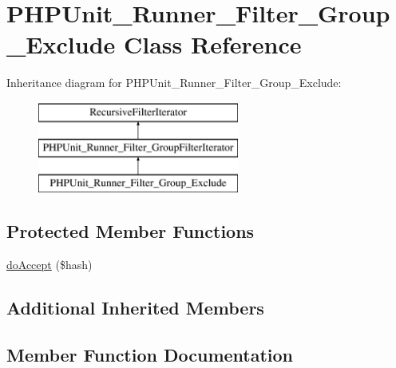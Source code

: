 \hypertarget{class_p_h_p_unit___runner___filter___group___exclude}{}\section{P\+H\+P\+Unit\+\_\+\+Runner\+\_\+\+Filter\+\_\+\+Group\+\_\+\+Exclude Class Reference}
\label{class_p_h_p_unit___runner___filter___group___exclude}
Inheritance diagram for P\+H\+P\+Unit\+\_\+\+Runner\+\_\+\+Filter\+\_\+\+Group\+\_\+\+Exclude\+:\begin{figure}[H]
\begin{center}
\leavevmode
\includegraphics[height=3.000000cm]{class_p_h_p_unit___runner___filter___group___exclude}
\end{center}
\end{figure}
\subsection*{Protected Member Functions}
\begin{DoxyCompactItemize}
\item 
\mbox{\hyperlink{class_p_h_p_unit___runner___filter___group___exclude_acbbdccc716fb8365bbb7282b6851cc19}{do\+Accept}} (\$hash)
\end{DoxyCompactItemize}
\subsection*{Additional Inherited Members}


\subsection{Member Function Documentation}
\mbox{\label{class_p_h_p_unit___runner___filter___group___exclude_acbbdccc716fb8365bbb7282b6851cc19}} 
